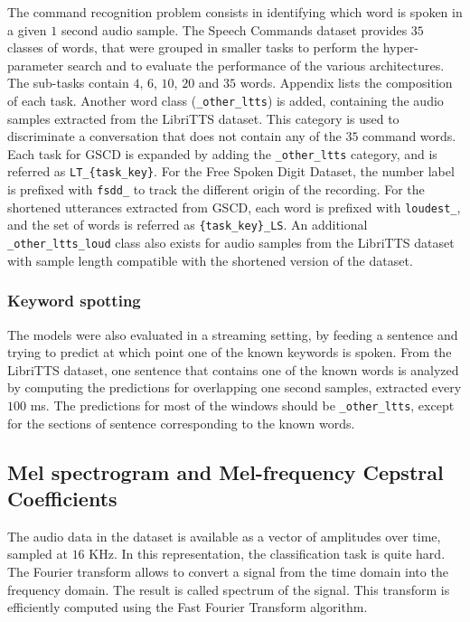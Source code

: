 The command recognition problem consists in identifying which word is spoken in
a given $1$ second audio sample.
%
The Speech Commands dataset provides $35$ classes of words, that were grouped
in smaller tasks to perform the hyper-parameter search and to evaluate the
performance of the various architectures.
%
The sub-tasks contain $4$, $6$, $10$, $20$ and $35$ words. Appendix
 lists the composition of each task.
%
Another word class (\texttt{\_other\_ltts}) is added, containing the audio
samples extracted from the LibriTTS dataset. This category is used to
discriminate a conversation that does not contain any of the $35$ command
words.
%
Each task for GSCD is expanded by adding the \texttt{\_other\_ltts} category,
and is referred as \texttt{LT\_\{task\_key\}}.
%
For the Free Spoken Digit Dataset, the number label is prefixed with
\texttt{fsdd\_} to track the different origin of the recording.
%
For the shortened utterances extracted from GSCD, each word is prefixed with
\texttt{loudest\_}, and the set of words is referred as
\texttt{\{task\_key\}\_LS}.
%
An additional \texttt{\_other\_ltts\_loud} class also exists for audio samples
from the LibriTTS dataset with sample length compatible with the shortened
version of the dataset.

\subsubsection{Keyword spotting}

The models were also evaluated in a streaming setting, by feeding a sentence
and trying to predict at which point one of the known keywords is spoken.
%
From the LibriTTS dataset, one sentence that contains one of the known words is
analyzed by computing the predictions for overlapping one second samples,
extracted every $100$ ms.
%
The predictions for most of the windows should be \texttt{\_other\_ltts},
except for the sections of sentence corresponding to the known words.

\subsection{Mel spectrogram and Mel-frequency Cepstral Coefficients}

The audio data in the dataset is available as a vector of amplitudes over time,
sampled at $16$ KHz. In this representation, the classification task is quite
hard.
The Fourier transform allows to convert a signal from the time domain into the
frequency domain. The result is called spectrum of the signal. This transform
is efficiently computed using the Fast Fourier Transform algorithm.

